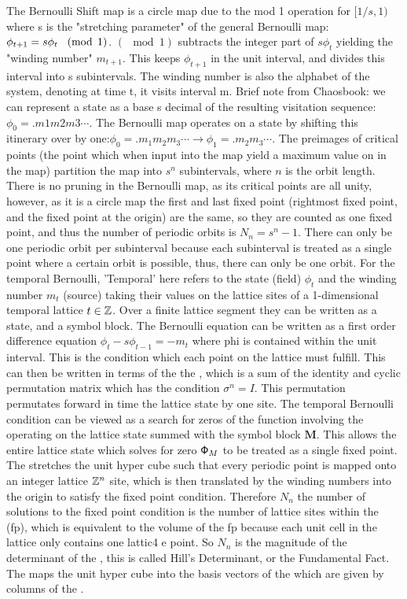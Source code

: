 \begin{description}
The Bernoulli Shift map is a circle map due to the mod 1
operation for $[1/s,1)$ where s is the "stretching parameter" of the
general Bernoulli map: $\phi_{t+1}=s\phi_t \hspace{3mm} (\mod
\hspace{1mm}1)$. $(\mod 1)$ subtracts the integer part of $s\phi_t$ yielding
the "winding number" $m_{t+1}$. This keeps $\phi_{t+1}$ in the unit
interval, and divides this interval into s subintervals. The winding
number is also the alphabet of the system, denoting at time t, it visits
interval m. Brief note from Chaosbook: we can represent a state as a base
s decimal of the resulting visitation sequence: $\phi_0=.m1m2m3\cdots$.
The Bernoulli map operates on a state by shifting this itinerary over by
one:$\phi_0=.m_1m_2m_3\cdots\rightarrow\phi_1=.m_2m_3\cdots$. The
preimages of critical points (the point which when input into the map
yield a maximum value on in the map) partition the map into $s^n$
subintervals, where $n$ is the orbit length. There is no pruning in the
Bernoulli map, as its critical points are all unity, however, as it is a
circle map the first and last fixed point (rightmost fixed point, and the
fixed point at the origin) are the same, so they are counted as one fixed
point, and thus the number of periodic orbits is $N_n=s^n-1$. There can
only be one periodic orbit per subinterval because each subinterval is
treated as a single point where a certain orbit is possible, thus, there
can only be one orbit. For the temporal Bernoulli, 'Temporal' here refers
to the state (field) $\phi_t$ and the winding number $m_t$ (source)
taking their values on the lattice sites of a 1-dimensional temporal
lattice $t\in\integers$. Over a finite lattice segment they can be
written as a state, and a symbol block. The Bernoulli equation can be
written as a first order difference equation $\phi_t-s\phi_{t-1}=-m_t$
where phi is contained within the unit interval. This is the condition
which each point on the lattice must fulfill. This can then be written in
terms of the the {\jacobianOrb}, which is a sum of the identity
and cyclic permutation matrix which has the condition $\sigma^{n}=I$.
This permutation permutates forward in time the lattice state by one
site. The temporal Bernoulli condition can be viewed as a search for
zeros of the function involving the {\jacobianOrb} operating on the
lattice state summed with the symbol block $\mathbf{M}$. This allows the
entire lattice state which solves for zero $\Xx_M$ to be treated as a
single fixed point. The {\jacobianOrb} stretches the unit hyper cube such
that every periodic point is mapped onto an integer lattice $\integers^n$
site, which is then translated by the winding numbers into the origin to
satisfy the fixed point condition. Therefore $N_n$ the number of
solutions to the fixed point condition is the number of lattice sites
within the {\fundPip} (fp), which is equivalent to the
volume of the fp because each unit cell in the lattice only contains one
lattic4 e point. So $N_n$ is the magnitude of the determinant of the
{\jacobianOrb}, this is called Hill's Determinant, or the Fundamental
Fact. The {\jacobianOrb} maps the unit hyper cube into the basis vectors
of the {\fundPip} which are given by columns of the {\jacobianOrb}.



\end{description}

